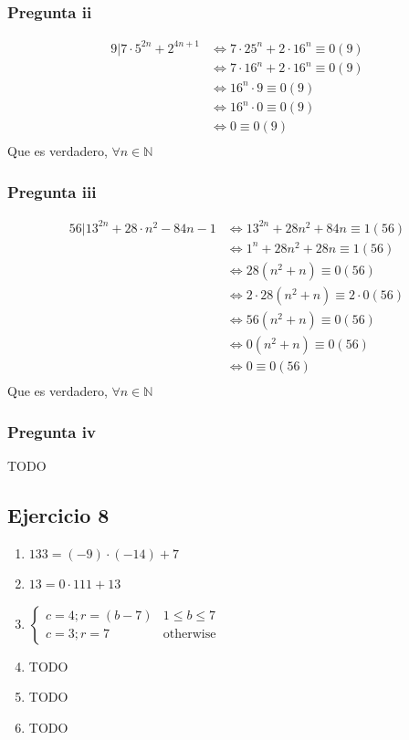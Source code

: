 \subsubsection{Pregunta ii}
\begin{align*}
    9| 7\cdot 5^{2n} + 2^{4n+1} &\iff 7\cdot 25^n + 2\cdot 16^n \equiv 0(9) \\
    &\iff 7\cdot 16^n + 2\cdot 16^n \equiv 0(9) \\
    &\iff 16^n \cdot 9 \equiv 0(9) \\
    &\iff 16^n \cdot 0 \equiv 0(9) \\
    &\iff 0 \equiv 0(9) \\
\end{align*}
Que es verdadero, $ \forall n \in \mathbb{N} $

\subsubsection{Pregunta iii}
\begin{align*}
    56 | 13^{2n} + 28 \cdot n^2 - 84n -1 &\iff 13^{2n} + 28n^2 + 84n \equiv 1 (56) \\
    &\iff 1^{n} + 28n^2 + 28n \equiv 1 (56) \\
    &\iff 28(n^2+n)\equiv 0 (56) \\
    &\iff 2\cdot 28(n^2+n)\equiv 2\cdot 0 (56) \\
    &\iff 56(n^2+n)\equiv 0 (56) \\
    &\iff 0(n^2+n)\equiv 0 (56) \\
    &\iff 0\equiv 0 (56) \\
\end{align*}
Que es verdadero, $ \forall n \in \mathbb{N} $

\subsubsection{Pregunta iv}
TODO

\subsection{Ejercicio 8}
\begin{enumerate}
    \item $ 133 = (-9) \cdot (-14) + 7 $ 
    \item $ 13 = 0 \cdot 111 + 13 $ 
    \item $\begin{cases}
        c = 4; r = (b-7) & 1\leq b \leq 7 \\
        c = 3; r = 7 & \text{otherwise} 
    \end{cases}$
    \item TODO
    \item TODO
    \item TODO
\end{enumerate}

